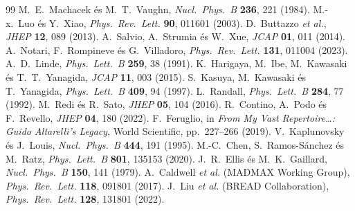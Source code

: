 \documentclass[11pt,a4paper]{article}
\begin{document}
\begin{thebibliography}{99}
 M.~E.~Machacek és M.~T.~Vaughn, \emph{Nucl.\ Phys.\ B} \textbf{236}, 221 (1984).
 M.-x.~Luo és Y.~Xiao, \emph{Phys.\ Rev.\ Lett.} \textbf{90}, 011601 (2003).
 D.~Buttazzo \textit{et al.}, \emph{JHEP} \textbf{12}, 089 (2013).
 A.~Salvio, A.~Strumia és W.~Xue, \emph{JCAP} \textbf{01}, 011 (2014).
 A.~Notari, F.~Rompineve és G.~Villadoro, \emph{Phys.\ Rev.\ Lett.} \textbf{131}, 011004 (2023).
 A.~D.~Linde, \emph{Phys.\ Lett.\ B} \textbf{259}, 38 (1991).
 K.~Harigaya, M.~Ibe, M.~Kawasaki és T.~T.~Yanagida, \emph{JCAP} \textbf{11}, 003 (2015).
 S.~Kasuya, M.~Kawasaki és T.~Yanagida, \emph{Phys.\ Lett.\ B} \textbf{409}, 94 (1997).
 L.~Randall, \emph{Phys.\ Lett.\ B} \textbf{284}, 77 (1992).
 M.~Redi és R.~Sato, \emph{JHEP} \textbf{05}, 104 (2016).
 R.~Contino, A.~Podo és F.~Revello, \emph{JHEP} \textbf{04}, 180 (2022).
 F.~Feruglio, in \emph{From My Vast Repertoire\dots: Guido Altarelli's Legacy}, World Scientific, pp.~227--266 (2019).
 V.~Kaplunovsky és J.~Louis, \emph{Nucl.\ Phys.\ B} \textbf{444}, 191 (1995).
 M.-C.~Chen, S.~Ramos-Sánchez és M.~Ratz, \emph{Phys.\ Lett.\ B} \textbf{801}, 135153 (2020).
 J.~R.~Ellis és M.~K.~Gaillard, \emph{Nucl.\ Phys.\ B} \textbf{150}, 141 (1979).
 A.~Caldwell \textit{et al.} (MADMAX Working Group), \emph{Phys.\ Rev.\ Lett.} \textbf{118}, 091801 (2017).
 J.~Liu \textit{et al.} (BREAD Collaboration), \emph{Phys.\ Rev.\ Lett.} \textbf{128}, 131801 (2022).
\end{thebibliography}
\end{document}
